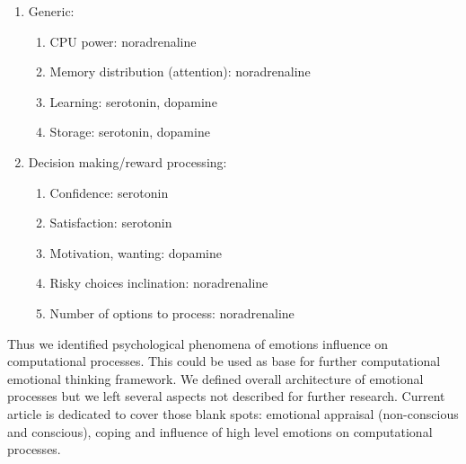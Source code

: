 \begin{enumerate}
	\item  Generic:
	\begin{enumerate}
		\item  CPU power: noradrenaline
		\item  Memory distribution (attention): noradrenaline
		\item  Learning: serotonin, dopamine
		\item  Storage: serotonin, dopamine
	\end{enumerate}
	\item  Decision making/reward processing:
	\begin{enumerate}
		\item  Confidence: serotonin
		\item  Satisfaction: serotonin
		\item  Motivation, wanting: dopamine
		\item  Risky choices inclination: noradrenaline
		\item  Number of options to process: noradrenaline
	\end{enumerate}
\end{enumerate}

Thus we identified psychological phenomena of emotions influence on computational processes. This could be used as base for further computational emotional thinking framework. We defined overall architecture of emotional processes but we left several aspects not described for further research. Current article is dedicated to cover those blank spots: emotional appraisal (non-conscious and conscious), coping and influence of high level emotions on computational processes.

